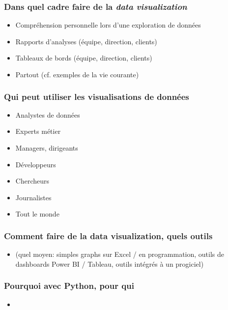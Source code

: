 \begin{frame}\frametitle{Dans quel cadre faire de la \textit{data visualization}}
   \begin{itemize}
         \item Compréhension personnelle lors d'une exploration de données
         \item Rapports d'analyses (équipe, direction, clients)
         \item Tableaux de bords (équipe, direction, clients)
         \item Partout (cf. exemples de la vie courante)
   \end{itemize}
\end{frame}

\begin{frame}\frametitle{Qui peut utiliser les visualisations de données}
   \begin{itemize}
      \item Analystes de données
      \item Experts métier
      \item Managers, dirigeants
      \item Développeurs
      \item Chercheurs
      \item Journalistes
      \item Tout le monde
   \end{itemize}
\end{frame}


\begin{frame}\frametitle{Comment faire de la data visualization, quels outils}
   \begin{itemize}
      \item (quel moyen: simples graphs sur Excel / en programmation, outils de dashboards Power BI / Tableau, outils intégrés à un progiciel)
   \end{itemize}
\end{frame}

\begin{frame}\frametitle{Pourquoi avec Python, pour qui}
   \begin{itemize}
      \item 
   \end{itemize}
\end{frame}

